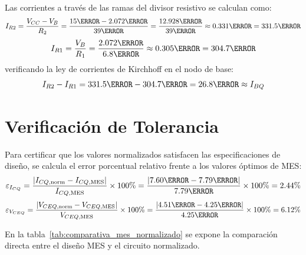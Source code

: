 Las corrientes a través de las ramas del divisor resistivo se calculan como:
\begin{equation}
  I_{R2} = \frac{V_{CC} - V_B}{R_2} = \frac{15\V - 2.072\V}{39\kohm} = \frac{12.928\V}{39\kohm} \approx 0.331\mA = 331.5\uA
\end{equation}
\begin{equation}
  I_{R1} = \frac{V_B}{R_1} = \frac{2.072\V}{6.8\kohm} \approx 0.305\mA = 304.7\uA
\end{equation}
verificando la ley de corrientes de Kirchhoff en el nodo de base:
\begin{equation}
  I_{R2} - I_{R1} = 331.5\uA - 304.7\uA = 26.8\uA \approx I_{BQ}
\end{equation}

\section{Verificación de Tolerancia}

Para certificar que los valores normalizados satisfacen las especificaciones de diseño, se calcula el error
porcentual relativo frente a los valores óptimos de MES:
\begin{equation}
  \varepsilon_{I_{CQ}} = \frac{|I_{CQ,\text{norm}} - I_{CQ,\text{MES}}|}{I_{CQ,\text{MES}}} \times 100\% = \frac{|7.60\mA - 7.79\mA|}{7.79\mA} \times 100\% = 2.44\%
\end{equation}
\begin{equation}
  \varepsilon_{V_{CEQ}} = \frac{|V_{CEQ,\text{norm}} - V_{CEQ,\text{MES}}|}{V_{CEQ,\text{MES}}} \times 100\% = \frac{|4.51\V - 4.25\V|}{4.25\V} \times 100\% = 6.12\%
\end{equation}

En la tabla~\ref{tab:comparativa_mes_normalizado} se expone la comparación directa entre el diseño MES y el circuito normalizado.

